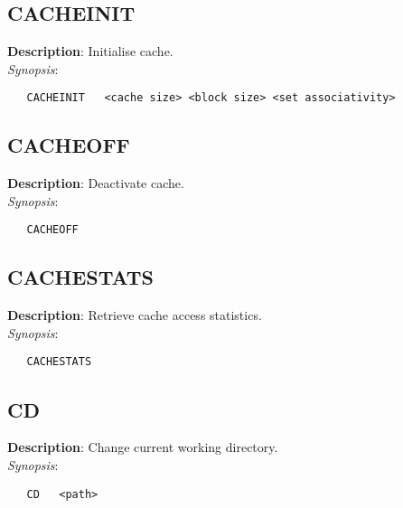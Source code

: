\subsection{\bf CACHEINIT}
\label{manpages:CACHEINIT}
\label{manpages:cacheinit}
\vspace{-0.2in}
{\bf Description}: 	Initialise cache.\\[1.5ex]
{\em Synopsis}:
\vspace{-0.2in}
\scriptsize
\begin{verbatim}
   CACHEINIT   <cache size> <block size> <set associativity> 	
\end{verbatim}
\normalsize
\vspace{-0.2in}


\subsection{\bf CACHEOFF}
\label{manpages:CACHEOFF}
\label{manpages:cacheoff}
\vspace{-0.2in}
{\bf Description}: 	Deactivate cache.\\[1.5ex]
{\em Synopsis}:
\vspace{-0.2in}
\scriptsize
\begin{verbatim}
   CACHEOFF    							
\end{verbatim}
\normalsize
\vspace{-0.2in}


\subsection{\bf CACHESTATS}
\label{manpages:CACHESTATS}
\label{manpages:cachestats}
\vspace{-0.2in}
{\bf Description}: 	Retrieve cache access statistics.\\[1.5ex]
{\em Synopsis}:
\vspace{-0.2in}
\scriptsize
\begin{verbatim}
   CACHESTATS   					
\end{verbatim}
\normalsize
\vspace{-0.2in}


\subsection{\bf CD}
\label{manpages:CD}
\label{manpages:cd}
\vspace{-0.2in}
{\bf Description}: 	Change current working directory.\\[1.5ex]
{\em Synopsis}:
\vspace{-0.2in}
\scriptsize
\begin{verbatim}
   CD   <path>				
\end{verbatim}
\normalsize
\vspace{-0.2in}


